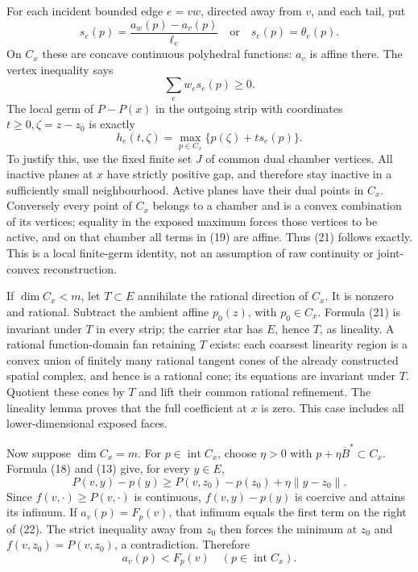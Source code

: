 \documentclass[
  11pt,
]{article}
\begin{document}
For each incident bounded edge \(e=vw\), directed away from \(v\), and
each tail, put \[
 s_e(p)=\frac{a_w(p)-a_v(p)}{\ell_e}\quad\text{or}\quad s_e(p)=\theta_e(p).
                                                                         \tag{19}
\] On \(C_x\) these are concave continuous polyhedral functions: \(a_v\)
is affine there. The vertex inequality says \[
                           \sum_e w_es_e(p)\geq0.                         \tag{20}
\] The local germ of \(P-P(x)\) in the outgoing strip with coordinates
\(t\geq0, \zeta=z-z_0\) is exactly \[
                  h_e(t,\zeta)=\max_{p\in C_x}\{p(\zeta)+t s_e(p)\}.       \tag{21}
\] To justify this, use the fixed finite set \(J\) of common dual
chamber vertices. All inactive planes at \(x\) have strictly positive
gap, and therefore stay inactive in a sufficiently small neighbourhood.
Active planes have their dual points in \(C_x\). Conversely every point
of \(C_x\) belongs to a chamber and is a convex combination of its
vertices; equality in the exposed maximum forces those vertices to be
active, and on that chamber all terms in (19) are affine. Thus (21)
follows exactly. This is a local finite-germ identity, not an assumption
of raw continuity or joint-convex reconstruction.

If \(\dim C_x<m\), let \(T\subset E\) annihilate the rational direction
of \(C_x\). It is nonzero and rational. Subtract the ambient affine
\(p_0(z)\), with \(p_0\in C_x\). Formula (21) is invariant under \(T\)
in every strip; the carrier star has \(E\), hence \(T\), as lineality. A
rational function-domain fan retaining \(T\) exists: each coarsest
linearity region is a convex union of finitely many rational tangent
cones of the already constructed spatial complex, and hence is a
rational cone; its equations are invariant under \(T\). Quotient these
cones by \(T\) and lift their common rational refinement. The lineality
lemma proves that the full coefficient at \(x\) is zero. This case
includes all lower-dimensional exposed faces.

Now suppose \(\dim C_x=m\). For \(p\in\operatorname{int}C_x\), choose
\(\eta>0\) with \(p+\eta\overline B^*\subset C_x\). Formula (18) and
(13) give, for every \(y\in E\), \[
 P(v,y)-p(y)\geq P(v,z_0)-p(z_0)+\eta\|y-z_0\|.                           \tag{22}
\] Since \(f(v,\cdot)\geq P(v,\cdot)\) is continuous, \(f(v,y)-p(y)\) is
coercive and attains its infimum. If \(a_v(p)=F_p(v)\), that infimum
equals the first term on the right of (22). The strict inequality away
from \(z_0\) then forces the minimum at \(z_0\) and
\(f(v,z_0)=P(v,z_0)\), a contradiction. Therefore \[
                         a_v(p)<F_p(v)\quad(p\in\operatorname{int}C_x).    \tag{23}
\]
\end{document}
